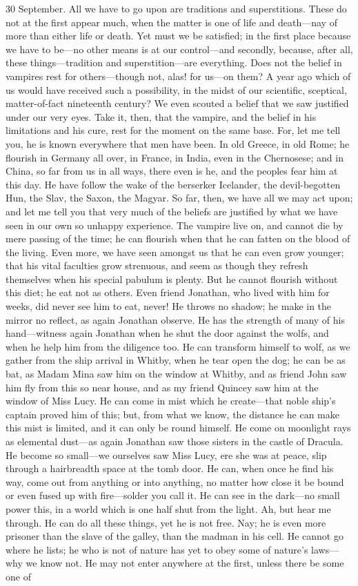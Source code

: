 \begin{diary}{30 September.}
All we have to go upon are traditions and superstitions. These do not at the first appear much, when the matter is one of life and death—nay of more than either life or death. Yet must we be satisfied; in the first place because we have to be—no other means is at our control—and secondly, because, after all, these things—tradition and superstition—are everything. Does not the belief in vampires rest for others—though not, alas! for us—on them? A year ago which of us would have received such a possibility, in the midst of our scientific, sceptical, matter-of-fact nineteenth century? We even scouted a belief that we saw justified under our very eyes. Take it, then, that the vampire, and the belief in his limitations and his cure, rest for the moment on the same base. For, let me tell you, he is known everywhere that men have been. In old Greece, in old Rome; he flourish in Germany all over, in France, in India, even in the Chernosese; and in China, so far from us in all ways, there even is he, and the peoples fear him at this day. He have follow the wake of the berserker Icelander, the devil-begotten Hun, the Slav, the Saxon, the Magyar. So far, then, we have all we may act upon; and let me tell you that very much of the beliefs are justified by what we have seen in our own so unhappy experience. The vampire live on, and cannot die by mere passing of the time; he can flourish when that he can fatten on the blood of the living. Even more, we have seen amongst us that he can even grow younger; that his vital faculties grow strenuous, and seem as though they refresh themselves when his special pabulum is plenty. But he cannot flourish without this diet; he eat not as others. Even friend Jonathan, who lived with him for weeks, did never see him to eat, never! He throws no shadow; he make in the mirror no reflect, as again Jonathan observe. He has the strength of many of his hand—witness again Jonathan when he shut the door against the wolfs, and when he help him from the diligence too. He can transform himself to wolf, as we gather from the ship arrival in Whitby, when he tear open the dog; he can be as bat, as Madam Mina saw him on the window at Whitby, and as friend John saw him fly from this so near house, and as my friend Quincey saw him at the window of Miss Lucy. He can come in mist which he create—that noble ship's captain proved him of this; but, from what we know, the distance he can make this mist is limited, and it can only be round himself. He come on moonlight rays as elemental dust—as again Jonathan saw those sisters in the castle of Dracula. He become so small—we ourselves saw Miss Lucy, ere she was at peace, slip through a hairbreadth space at the tomb door. He can, when once he find his way, come out from anything or into anything, no matter how close it be bound or even fused up with fire—solder you call it. He can see in the dark—no small power this, in a world which is one half shut from the light. Ah, but hear me through. He can do all these things, yet he is not free. Nay; he is even more prisoner than the slave of the galley, than the madman in his cell. He cannot go where he lists; he who is not of nature has yet to obey some of nature's laws—why we know not. He may not enter anywhere at the first, unless there be some one of 
\end{diary}
